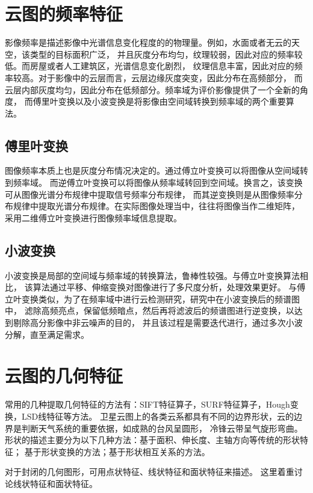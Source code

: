 \section{云图的频率特征}
影像频率是描述影像中光谱信息变化程度的的物理量。例如，水面或者无云的天空，该类型的目标面积广泛，
并且灰度分布均匀，纹理较弱，因此对应的频率较低。而房屋或者人工建筑区，光谱信息变化剧烈，
纹理信息丰富，因此对应的频率较高。对于影像中的云层而言，云层边缘灰度突变，因此分布在高频部分，
而云层内部灰度均匀，因此分布在低频部分。频率域为评价影像提供了一个全新的角度，
而傅里叶变换以及小波变换是将影像由空间域转换到频率域的两个重要算法\cite{gaofenbianlv}\cite{pinlv}。

\subsection{傅里叶变换}
图像频率本质上也是灰度分布情况决定的。通过傅立叶变换可以将图像从空间域转到频率域。
而逆傅立叶变换可以将图像从频率域转回到空间域。换言之，该变换可从图像光谱分布规律中提取信号频率分布规律，
而其逆变换则是从图像频率分布规律中提取光谱分布规律。在实际图像处理当中，往往将图像当作二维矩阵，
采用二维傅立叶变换进行图像频率域信息提取。

\subsection{小波变换}
小波变换是局部的空间域与频率域的转换算法，鲁棒性较强。与傅立叶变换算法相比，
该算法通过平移、伸缩变换对图像进行了多尺度分析，处理效果更好。
与傅立叶变换类似，为了在频率域中进行云检测研究，研究中在小波变换后的频谱图中，
滤除高频亮点，保留低频暗点，然后再将滤波后的频谱图进行逆变换，以达到剔除高分影像中非云噪声的目的，
并且该过程是需要迭代进行，通过多次小波分解，直至满足需求。




\section{云图的几何特征}
常用的几种提取几何特征的方法有：SIFT特征算子，SURF特征算子，Hough变换，LSD线特征等方法。 
卫星云图上的各类云系都具有不同的边界形状，云的边界是判断天气系统的重要依据，如成熟的台风呈圆形，
冷锋云带呈气旋形弯曲。形状的描述主要分为以下几种方法：基于面积、伸长度、主轴方向等传统的形状特征；
基于形状变换的方法；基于形状相互关系的方法\cite{lunkuofa}\cite{lunkuofa_eng}。 

对于封闭的几何图形，可用点状特征、线状特征和面状特征来描述。
这里着重讨论线状特征和面状特征\cite{jihetezheng}。

